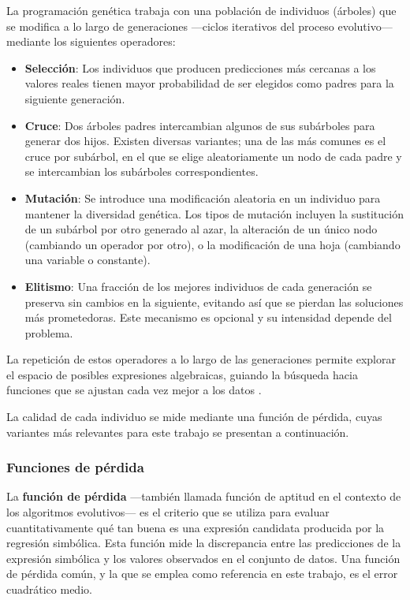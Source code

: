 \documentclass[12pt,a4paper]{article} \usepackage[utf8]{inputenc} \usepackage[spanish]{babel} \usepackage{amsmath, amssymb, amsthm} \usepackage{bm} \usepackage{float} \usepackage{longtable} \usepackage[hidelinks]{hyperref}
\begin{document}
La programación genética trabaja con una población de individuos (árboles) que se modifica a lo largo de generaciones —ciclos iterativos del proceso evolutivo— mediante los siguientes operadores:

\begin{itemize}
 \item \textbf{Selección}: Los individuos que producen predicciones más cercanas a los valores reales tienen mayor probabilidad de ser elegidos como padres para la siguiente generación.

 \item \textbf{Cruce}: Dos árboles padres intercambian algunos de sus subárboles para generar dos hijos. Existen diversas variantes; una de las más comunes es el cruce por subárbol, en el que se elige aleatoriamente un nodo de cada padre y se intercambian los subárboles correspondientes.

 \item \textbf{Mutación}: Se introduce una modificación aleatoria en un individuo para mantener la diversidad genética. Los tipos de mutación incluyen la sustitución de un subárbol por otro generado al azar, la alteración de un único nodo (cambiando un operador por otro), o la modificación de una hoja (cambiando una variable o constante).

 \item \textbf{Elitismo}: Una fracción de los mejores individuos de cada generación se preserva sin cambios en la siguiente, evitando así que se pierdan las soluciones más prometedoras. Este mecanismo es opcional y su intensidad depende del problema.
\end{itemize}

La repetición de estos operadores a lo largo de las generaciones permite explorar el espacio de posibles expresiones algebraicas, guiando la búsqueda hacia funciones que se ajustan cada vez mejor a los datos \cite{koza1992genetic}.

La calidad de cada individuo se mide mediante una función de pérdida, cuyas variantes más relevantes para este trabajo se presentan a continuación.

\subsubsection{Funciones de pérdida}

La \textbf{función de pérdida} ---también llamada función de aptitud en el contexto de los algoritmos evolutivos--- es el criterio que se utiliza para evaluar cuantitativamente qué tan buena es una expresión candidata producida por la regresión simbólica. Esta función mide la discrepancia entre las predicciones de la expresión simbólica y los valores observados en el conjunto de datos. Una función de pérdida común, y la que se emplea como referencia en este trabajo, es el error cuadrático medio.
\end{document}
